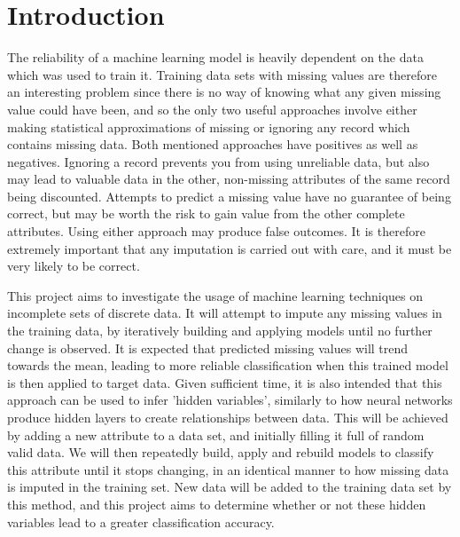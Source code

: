 \newpage
\chapter{Introduction}
The reliability of a machine learning model is heavily dependent on the data which was used to train it. Training data sets with missing values are therefore an interesting problem since there is no way of knowing what any given missing value could have been, and so the only two useful approaches involve either making statistical approximations of missing or ignoring any record which contains missing data. Both mentioned approaches have positives as well as negatives. Ignoring a record prevents you from using unreliable data, but also may lead to valuable data in the other, non-missing attributes of the same record being discounted. Attempts to predict a missing value have no guarantee of being correct, but may be worth the risk to gain value from the other complete attributes. Using either approach may produce false outcomes. It is therefore extremely important that any imputation is carried out with care, and it must be very likely to be correct.

This project aims to investigate the usage of machine learning techniques on incomplete sets of discrete data. It will attempt to impute any missing values in the training data, by iteratively building and applying models until no further change is observed. It is expected that predicted missing values will trend towards the mean, leading to more reliable classification when this trained model is then applied to target data.  Given sufficient time, it is also intended that this approach can be used to infer 'hidden variables', similarly to how neural networks produce hidden layers to create relationships between data. This will be achieved by adding a new attribute to a data set, and initially filling it full of random valid data. We will then repeatedly build, apply and rebuild models to classify this attribute until it stops changing, in an identical manner to how missing data is imputed in the training set. New data will be added to the training data set by this method, and this project aims to determine whether or not these hidden variables lead to a greater classification accuracy. 
